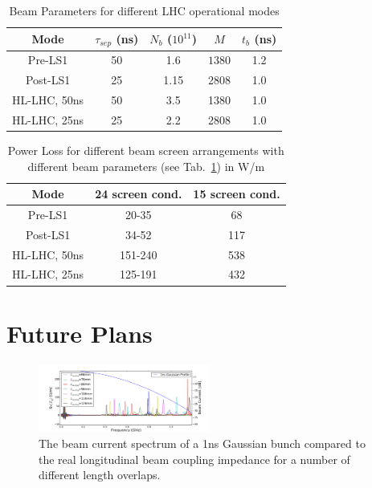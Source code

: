 \documentclass[a4paper,
              ]{jacow}
\begin{document}
\begin{table}
\caption{Beam Parameters for different LHC operational modes}
\label{tab:beamPara}
\begin{center}
\begin{tabular}{c | c | c | c | c}
Mode & $\tau_{sep}$ (ns) & $N_{b}$ ($10^{11}$) & $ M $ & $t_{b}$ (ns) \\ \hline 
Pre-LS1 & 50 & 1.6 & $ 1380 $ & 1.2 \\ \hline 
Post-LS1 & 25 & 1.15 & 2808 & 1.0 \\ \hline 
HL-LHC, 50ns & 50 & 3.5 & 1380 & 1.0 \\ \hline 
HL-LHC, 25ns & 25 & 2.2 & 2808 & 1.0 \\ 
\end{tabular}
\end{center}
\end{table}

\begin{table}
\caption{Power Loss for different beam screen arrangements with different beam parameters (see Tab.~\ref{tab:beamPara}) in W/m}
\label{tab:powLoss}
\begin{center}
\begin{tabular}{c | c | c}
Mode & 24 screen cond. & 15 screen cond. \\ \hline 
Pre-LS1 & 20-35 & 68 \\ \hline 
Post-LS1 & 34-52 & 117 \\ \hline 
HL-LHC, 50ns & 151-240 & 538  \\ \hline 
HL-LHC, 25ns & 125-191 & 432  \\ 
\end{tabular}
\end{center}
\end{table}

\section{Future Plans}

\begin{figure}
\includegraphics[width=0.5\textwidth]{TUPRI030f6.pdf}
\caption{The beam current spectrum of a 1ns Gaussian bunch compared to the real longitudinal beam coupling impedance for a number of different length overlaps.}
\label{fig:overLapSpec}
\end{figure}
\end{document}
